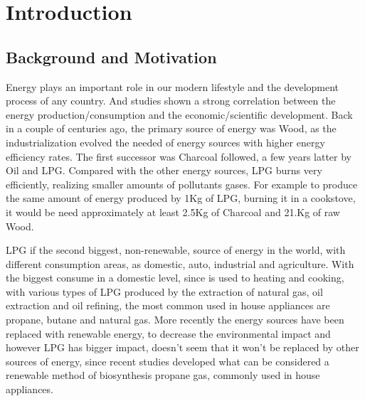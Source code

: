 \cleardoublepage
{}
\chapter{Introduction}
\section{Background and Motivation} %

Energy plays an important role in our modern lifestyle and the development process of any country. And studies shown a strong correlation between the energy production/consumption and the economic/scientific development. Back in a couple of centuries ago, the primary source of energy was Wood, as the industrialization evolved the needed of energy sources with higher energy efficiency rates\cite{demirbasGlobalEnergySources2004}. The first successor was Charcoal followed, a few years latter by Oil and LPG. Compared with the other energy sources, LPG burns very efficiently, realizing smaller amounts of pollutants gases. For example to produce the same amount of energy produced by 1Kg of LPG, burning it in a cookstove, it would be need approximately at least 2.5Kg of Charcoal and 21.Kg of raw Wood\cite{File201403Multiple}. 

LPG if the second biggest, non-renewable, source of energy in the world, with different consumption areas, as domestic, auto, industrial and agriculture. With the biggest consume in a domestic level, since is used to heating and cooking, with various types of LPG produced by the extraction of natural gas, oil extraction and oil refining, the most common used in house appliances are propane, butane and natural gas\cite{LiquefiedPetroleumGas}. More recently the energy sources have been replaced with renewable energy, to decrease the environmental impact and however LPG has bigger impact, doesn't seem that it won't be replaced by other sources of energy, since recent studies developed what can be considered a renewable method of biosynthesis propane gas\cite{kallioEngineeredPathwayBiosynthesis2014b}, commonly used in house appliances.   

